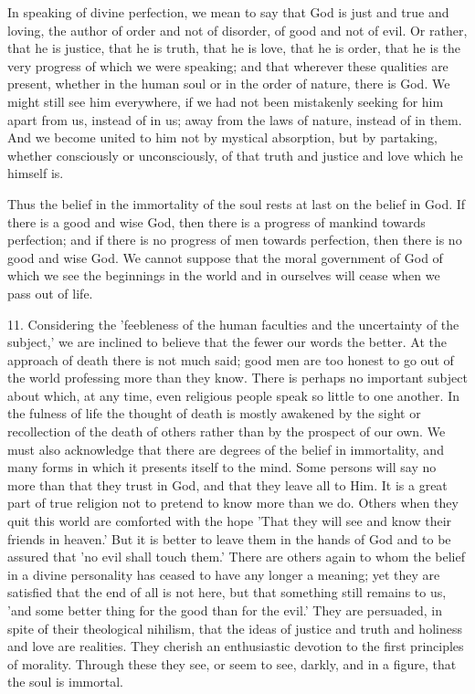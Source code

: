 In speaking of divine perfection, we mean to say that God is just and true
and loving, the author of order and not of disorder, of good and not of
evil. Or rather, that he is justice, that he is truth, that he is love,
that he is order, that he is the very progress of which we were speaking;
and that wherever these qualities are present, whether in the human soul
or in the order of nature, there is God. We might still see him
everywhere, if we had not been mistakenly seeking for him apart from us,
instead of in us; away from the laws of nature, instead of in them. And we
become united to him not by mystical absorption, but by partaking, whether
consciously or unconsciously, of that truth and justice and love which he
himself is.

Thus the belief in the immortality of the soul rests at last on the belief
in God. If there is a good and wise God, then there is a progress of
mankind towards perfection; and if there is no progress of men towards
perfection, then there is no good and wise God. We cannot suppose that the
moral government of God of which we see the beginnings in the world and in
ourselves will cease when we pass out of life.

11. Considering the 'feebleness of the human faculties and the uncertainty
of the subject,' we are inclined to believe that the fewer our words the
better. At the approach of death there is not much said; good men are too
honest to go out of the world professing more than they know. There is
perhaps no important subject about which, at any time, even religious
people speak so little to one another. In the fulness of life the thought
of death is mostly awakened by the sight or recollection of the death of
others rather than by the prospect of our own. We must also acknowledge
that there are degrees of the belief in immortality, and many forms in
which it presents itself to the mind. Some persons will say no more than
that they trust in God, and that they leave all to Him. It is a great part
of true religion not to pretend to know more than we do. Others when they
quit this world are comforted with the hope 'That they will see and know
their friends in heaven.' But it is better to leave them in the hands of
God and to be assured that 'no evil shall touch them.' There are others
again to whom the belief in a divine personality has ceased to have any
longer a meaning; yet they are satisfied that the end of all is not here,
but that something still remains to us, 'and some better thing for the
good than for the evil.' They are persuaded, in spite of their theological
nihilism, that the ideas of justice and truth and holiness and love are
realities. They cherish an enthusiastic devotion to the first principles
of morality. Through these they see, or seem to see, darkly, and in a
figure, that the soul is immortal.

